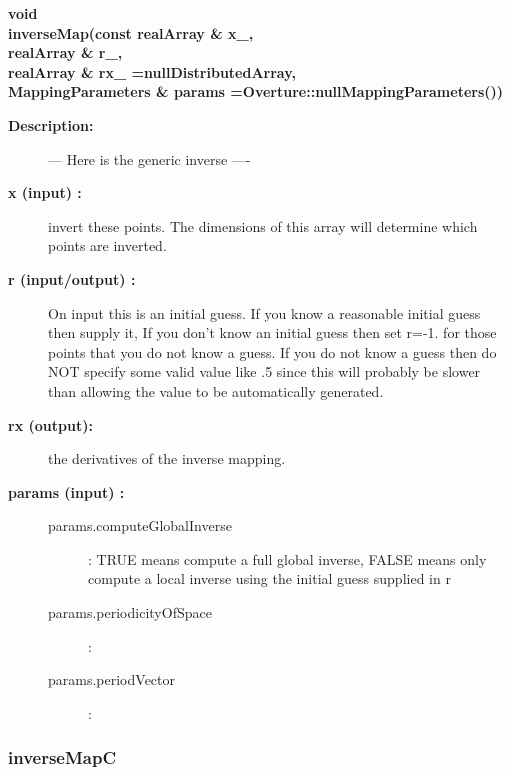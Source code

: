 \begin{flushleft} \textbf{%
void  \\ 
\settowidth{\MappingIncludeArgIndent}{inverseMap(}%
inverseMap(const realArray \& x\_, \\ 
\hspace{\MappingIncludeArgIndent}realArray \& r\_, \\ 
\hspace{\MappingIncludeArgIndent}realArray \& rx\_  =nullDistributedArray,\\ 
MappingParameters \& params   =Overture::nullMappingParameters())
}\end{flushleft}
\begin{description}
\item[{\bf Description:}] 
  --- Here is the generic inverse ----

\item[{\bf x (input) :}]  invert these points. The dimensions of this array will determine which
     points are inverted.
\item[{\bf r (input/output) :}]  On input this is an initial guess. If you know a reasonable initial
   guess then supply it, If you don't know an initial guess
    then set r=-1. for those points that you do not know a guess. If you do not know a guess
     then do NOT specify some valid value like .5 since this will probably be slower than allowing
     the value to be automatically generated.
\item[{\bf rx (output):}]  the derivatives of the inverse mapping.
\item[{\bf params (input) :}] 
   \begin{description}
     \item[params.computeGlobalInverse] : TRUE means compute a full global inverse,
       FALSE means only compute a local inverse using the initial guess supplied in r
     \item[params.periodicityOfSpace] : 
     \item[params.periodVector] : 
   \end{description}
\end{description}
\subsubsection{inverseMapC}
 
